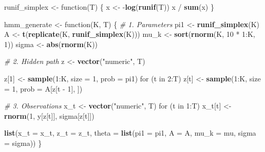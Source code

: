 \documentclass[]{article}
\newenvironment{Shaded}{\begin{snugshade}}{\end{snugshade}}
\newcommand{\KeywordTok}[1]{\textcolor[rgb]{0.13,0.29,0.53}{\textbf{{#1}}}}
\newcommand{\DataTypeTok}[1]{\textcolor[rgb]{0.13,0.29,0.53}{{#1}}}
\newcommand{\DecValTok}[1]{\textcolor[rgb]{0.00,0.00,0.81}{{#1}}}
\newcommand{\StringTok}[1]{\textcolor[rgb]{0.31,0.60,0.02}{{#1}}}
\newcommand{\CommentTok}[1]{\textcolor[rgb]{0.56,0.35,0.01}{\textit{{#1}}}}
\newcommand{\NormalTok}[1]{{#1}}
\begin{document}
\begin{Shaded}
\begin{Highlighting}[]
\NormalTok{runif_simplex <-}\StringTok{ }\NormalTok{function(T) \{}
  \NormalTok{x <-}\StringTok{ }\NormalTok{-}\KeywordTok{log}\NormalTok{(}\KeywordTok{runif}\NormalTok{(T))}
  \NormalTok{x /}\StringTok{ }\KeywordTok{sum}\NormalTok{(x)}
\NormalTok{\}}

\NormalTok{hmm_generate <-}\StringTok{ }\NormalTok{function(K, T) \{}
  \CommentTok{# 1. Parameters}
  \NormalTok{pi1 <-}\StringTok{ }\KeywordTok{runif_simplex}\NormalTok{(K)}
  \NormalTok{A <-}\StringTok{ }\KeywordTok{t}\NormalTok{(}\KeywordTok{replicate}\NormalTok{(K, }\KeywordTok{runif_simplex}\NormalTok{(K)))}
  \NormalTok{mu_k <-}\StringTok{ }\KeywordTok{sort}\NormalTok{(}\KeywordTok{rnorm}\NormalTok{(K, }\DecValTok{10} \NormalTok{*}\StringTok{ }\DecValTok{1}\NormalTok{:K, }\DecValTok{1}\NormalTok{))}
  \NormalTok{sigma <-}\StringTok{ }\KeywordTok{abs}\NormalTok{(}\KeywordTok{rnorm}\NormalTok{(K))}

  \CommentTok{# 2. Hidden path}
  \NormalTok{z <-}\StringTok{ }\KeywordTok{vector}\NormalTok{(}\StringTok{"numeric"}\NormalTok{, T)}

  \NormalTok{z[}\DecValTok{1}\NormalTok{] <-}\StringTok{ }\KeywordTok{sample}\NormalTok{(}\DecValTok{1}\NormalTok{:K, }\DataTypeTok{size =} \DecValTok{1}\NormalTok{, }\DataTypeTok{prob =} \NormalTok{pi1)}
  \NormalTok{for (t in }\DecValTok{2}\NormalTok{:T)}
    \NormalTok{z[t] <-}\StringTok{ }\KeywordTok{sample}\NormalTok{(}\DecValTok{1}\NormalTok{:K, }\DataTypeTok{size =} \DecValTok{1}\NormalTok{, }\DataTypeTok{prob =} \NormalTok{A[z[t -}\StringTok{ }\DecValTok{1}\NormalTok{], ])}

  \CommentTok{# 3. Observations}
  \NormalTok{x_t <-}\StringTok{ }\KeywordTok{vector}\NormalTok{(}\StringTok{"numeric"}\NormalTok{, T)}
  \NormalTok{for (t in }\DecValTok{1}\NormalTok{:T)}
    \NormalTok{x_t[t] <-}\StringTok{ }\KeywordTok{rnorm}\NormalTok{(}\DecValTok{1}\NormalTok{, y[z[t]], sigma[z[t]])}

  \KeywordTok{list}\NormalTok{(}\DataTypeTok{x_t =} \NormalTok{x_t, }\DataTypeTok{z_t =} \NormalTok{z_t,}
       \DataTypeTok{theta =} \KeywordTok{list}\NormalTok{(}\DataTypeTok{pi1 =} \NormalTok{pi1, }\DataTypeTok{A =} \NormalTok{A,}
                    \DataTypeTok{mu_k =} \NormalTok{mu, }\DataTypeTok{sigma =} \NormalTok{sigma))}
\NormalTok{\}}
\end{Highlighting}
\end{Shaded}
\end{document}
